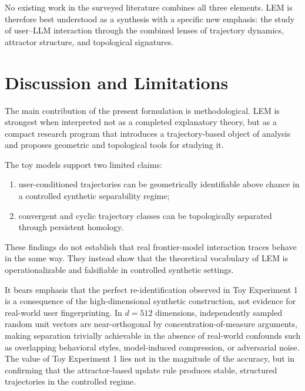 \documentclass[11pt]{article}
\begin{document}
No existing work in the surveyed literature combines all three elements. LEM is
therefore best understood as a synthesis with a specific new emphasis: the study of
user--LLM interaction through the combined lenses of trajectory dynamics, attractor
structure, and topological signatures.


\section{Discussion and Limitations}

The main contribution of the present formulation is methodological. LEM is strongest
when interpreted not as a completed explanatory theory, but as a compact research
program that introduces a trajectory-based object of analysis and proposes geometric
and topological tools for studying it.

The toy models support two limited claims:

\begin{enumerate}[leftmargin=1.8em]
  \item user-conditioned trajectories can be geometrically identifiable above chance
        in a controlled synthetic separability regime;
  \item convergent and cyclic trajectory classes can be topologically separated
        through persistent homology.
\end{enumerate}

These findings do not establish that real frontier-model interaction traces behave in
the same way. They instead show that the theoretical vocabulary of LEM is
operationalizable and falsifiable in controlled synthetic settings.

It bears emphasis that the perfect re-identification observed in Toy Experiment 1 is
a consequence of the high-dimensional synthetic construction, not evidence for
real-world user fingerprinting. In $d=512$ dimensions, independently sampled random
unit vectors are near-orthogonal by concentration-of-measure arguments, making
separation trivially achievable in the absence of real-world confounds such as
overlapping behavioral styles, model-induced compression, or adversarial noise. The
value of Toy Experiment 1 lies not in the magnitude of the accuracy, but in confirming
that the attractor-based update rule produces stable, structured trajectories in the
controlled regime.
\end{document}
